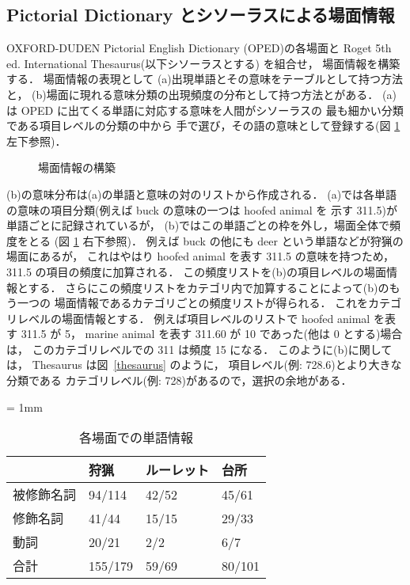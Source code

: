 \subsection{Pictorial Dictionary とシソーラスによる場面情報}

OXFORD-DUDEN Pictorial English Dictionary (OPED)の各場面と
Roget 5th ed. International Thesaurus(以下シソーラスとする) を組合せ，
場面情報を構築する．
場面情報の表現として
(a)出現単語とその意味をテーブルとして持つ方法と，
(b)場面に現れる意味分類の出現頻度の分布として持つ方法とがある．
(a)は OPED に出てくる単語に対応する意味を人間がシソーラスの
最も細かい分類である項目レベルの分類の中から
手で選び，その語の意味として登録する(図 \ref{construct} 左下参照)．
\begin{figure}
  \begin{center}
  \end{center}
  \caption{場面情報の構築}
  \label{construct}
\end{figure}
(b)の意味分布は(a)の単語と意味の対のリストから作成される．
(a)では各単語の意味の項目分類(例えば buck の意味の一つは hoofed animal を
示す 311.5)が単語ごとに記録されているが，
(b)ではこの単語ごとの枠を外し，場面全体で頻度をとる
(図 \ref{construct} 右下参照)．
例えば buck の他にも deer という単語などが狩猟の場面にあるが，
これはやはり hoofed animal を表す 311.5 の意味を持つため，
311.5 の項目の頻度に加算される．
この頻度リストを(b)の項目レベルの場面情報とする．
さらにこの頻度リストをカテゴリ内で加算することによって(b)のもう一つの
場面情報であるカテゴリごとの頻度リストが得られる．
これをカテゴリレベルの場面情報とする．
例えば項目レベルのリストで hoofed animal を表す 311.5 が 5，
marine animal を表す 311.60 が 10 であった(他は 0 とする)場合は，
このカテゴリレベルでの 311 は頻度 15 になる．
このように(b)に関しては，
Thesaurus は図~\ref{thesaurus} のように，
項目レベル(例: 728.6)とより大きな分類である
カテゴリレベル(例: 728)があるので，選択の余地がある．

\small
\begin{table}
  \caption{各場面での単語情報}
  \label{scene_words}
  \begin{center}
    \tabcolsep = 1mm
    \begin{tabular}{|l|l|l|l|} \hline
           & 狩猟 & ルーレット & 台所 \\ \hline \hline
被修飾名詞 & 94/114 & 42/52 & 45/61 \\
修飾名詞   & 41/44  & 15/15 & 29/33 \\
動詞       & 20/21  & 2/2   & 6/7   \\ \hline
合計       & 155/179& 59/69 & 80/101\\ \hline
    \end{tabular}
  \end{center}
\end{table}
\normalsize


